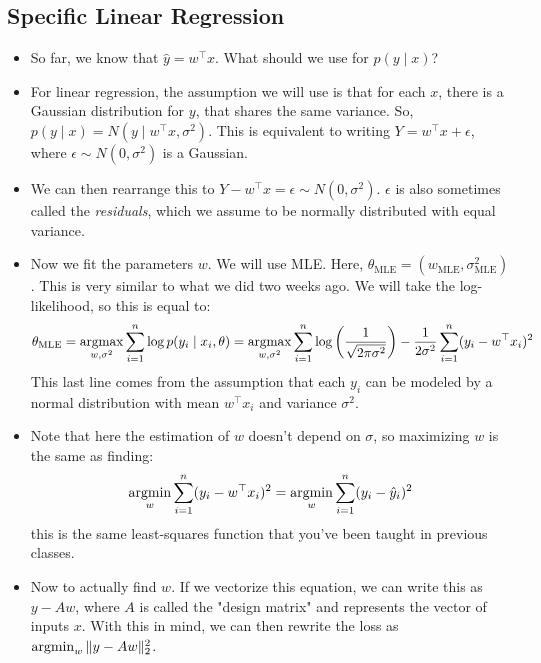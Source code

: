 \subsection{Specific Linear Regression}
\begin{itemize}
	\item So far, we know that \( \hat{y} = w^{\top} x \). What should we use for \(
		p(y \mid x)\)? 
	\item For linear regression, the assumption we will use is that for each \( x \),
		there is a Gaussian distribution for \( y \), that shares the same variance.
		So, \( p(y \mid x) = N(y \mid w^{\top} x, \sigma^2) \). This is equivalent to
		writing \( Y = w^{\top} x + \epsilon \), where \( \epsilon \sim N(0,
		\sigma^2)\) is a Gaussian. 

	\item We can then rearrange this to \( Y - w^{\top} x = \epsilon \sim N(0,
		\sigma^2) \). \( \epsilon \) is also sometimes called the \textit{residuals},
		which we assume to be normally distributed with equal variance. 

	\item Now we fit the parameters \( w \). We will use MLE. Here, \(
		\theta_\text{MLE} = (w_\text{MLE}, \sigma^2_\text{MLE})\). This is very
		similar to what we did two weeks ago. We will take the log-likelihood, so
		this is equal to:
		\[
			\theta_\text{MLE} = \operatorname*{argmax}_{w, \sigma^2} \sum_{i = 1}^{n} \log p(y_i
			\mid x_i, \theta) = \operatorname*{argmax}_{w, \sigma^2} \sum_{i = 1}^{n} \log\left(
			\frac{1}{\sqrt{2\pi\sigma^2}} \right) - \frac{1}{2\sigma^2} \sum_{i =
		1}^{n}(y_i - w^{\top} x_i)^2
		\]
		This last line comes from the assumption that each \( y_i \) can be modeled
		by a normal distribution with mean \( w^{\top} x_i \) and variance \(
		\sigma^2 \).  
	\item Note that here the estimation of \( w \) doesn't depend on \( \sigma \), so
		maximizing \( w \) is the same as finding:
		\[
			\operatorname*{argmin}_w \sum_{i = 1}^{n}(y_i - w^{\top} x_i)^2 = \operatorname*{argmin}_w \sum_{i =
			1}^{n}(y_i - \hat{y}_i)^2
		\]
		this is the same least-squares function that you've been taught in previous
		classes.  
	\item Now to actually find \( w \). If we vectorize this equation, we can write
		this as \( y - Aw \), where \( A \) is called the "design matrix" and
		represents the vector of inputs \( x \). With this in mind, we can then
		rewrite the loss as \( \operatorname*{argmin}_w \|y - Aw\|_2^2 \). 


\end{itemize}
